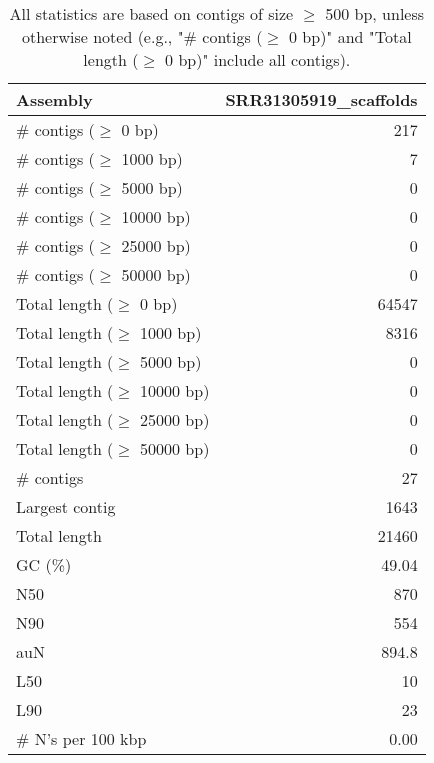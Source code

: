 \documentclass[12pt,a4paper]{article}
\begin{document}
\begin{table}[ht]
\begin{center}
\caption{All statistics are based on contigs of size $\geq$ 500 bp, unless otherwise noted (e.g., "\# contigs ($\geq$ 0 bp)" and "Total length ($\geq$ 0 bp)" include all contigs).}
\begin{tabular}{|l*{1}{|r}|}
\hline
Assembly & SRR31305919\_scaffolds \\ \hline
\# contigs ($\geq$ 0 bp) & 217 \\ \hline
\# contigs ($\geq$ 1000 bp) & 7 \\ \hline
\# contigs ($\geq$ 5000 bp) & 0 \\ \hline
\# contigs ($\geq$ 10000 bp) & 0 \\ \hline
\# contigs ($\geq$ 25000 bp) & 0 \\ \hline
\# contigs ($\geq$ 50000 bp) & 0 \\ \hline
Total length ($\geq$ 0 bp) & 64547 \\ \hline
Total length ($\geq$ 1000 bp) & 8316 \\ \hline
Total length ($\geq$ 5000 bp) & 0 \\ \hline
Total length ($\geq$ 10000 bp) & 0 \\ \hline
Total length ($\geq$ 25000 bp) & 0 \\ \hline
Total length ($\geq$ 50000 bp) & 0 \\ \hline
\# contigs & 27 \\ \hline
Largest contig & 1643 \\ \hline
Total length & 21460 \\ \hline
GC (\%) & 49.04 \\ \hline
N50 & 870 \\ \hline
N90 & 554 \\ \hline
auN & 894.8 \\ \hline
L50 & 10 \\ \hline
L90 & 23 \\ \hline
\# N's per 100 kbp & 0.00 \\ \hline
\end{tabular}
\end{center}
\end{table}
\end{document}
